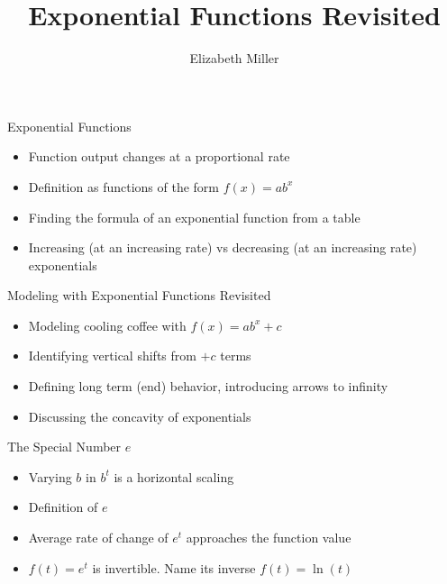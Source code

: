 \documentclass{ximera}
\author{Elizabeth Miller}
\title{Exponential Functions Revisited}
\begin{document}
\begin{abstract}
\end{abstract}
\maketitle


\begin{objectives}

\item Exponential Functions
\begin{itemize}
	\item Function output changes at a proportional rate 
	\item Definition as functions of the form $f(x)=ab^x$ 
	\item Finding the formula of an exponential function from a table 
	\item Increasing (at an increasing rate) vs decreasing (at an increasing rate) exponentials
\end{itemize}


\item Modeling with Exponential Functions Revisited 
\begin{itemize}
	\item Modeling cooling coffee with $f(x)= ab^x+c$ 
	\item Identifying vertical shifts from $+c$ terms
	\item Defining long term (end) behavior, introducing arrows to infinity
	\item Discussing the concavity of exponentials 
\end{itemize}


\item The Special Number $e$ 
\begin{itemize}
	\item Varying $b$ in $b^t$ is a horizontal scaling 
	\item Definition of $e$ 
	\item Average rate of change of $e^t$ approaches the function value 
	\item $f(t)=e^t$ is invertible.  Name its inverse $f(t)=\ln(t)$  
\end{itemize}

\end{objectives}
\end{document}
